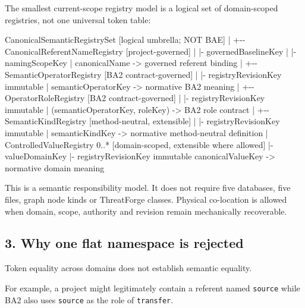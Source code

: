 \documentclass[
  10pt,
  a4paper,
]{article}
\newenvironment{Shaded}{}{}
\newcommand{\NormalTok}[1]{#1}
\begin{document}
The smallest current-scope registry model is a logical set of
domain-scoped registries, not one universal token table:

\begin{Shaded}
\begin{Highlighting}[]
\NormalTok{CanonicalSemanticRegistrySet                    [logical umbrella; NOT BAE]}
\NormalTok{|}
\NormalTok{+{-}{-} CanonicalReferentNameRegistry                [project{-}governed]}
\NormalTok{|    |{-} governedBaselineKey}
\NormalTok{|    |{-} namingScopeKey}
\NormalTok{|    \textasciigrave{}{-} canonicalName {-}\textgreater{} governed referent binding}
\NormalTok{|}
\NormalTok{+{-}{-} SemanticOperatorRegistry                     [BA2 contract{-}governed]}
\NormalTok{|    |{-} registryRevisionKey immutable}
\NormalTok{|    \textasciigrave{}{-} semanticOperatorKey {-}\textgreater{} normative BA2 meaning}
\NormalTok{|}
\NormalTok{+{-}{-} OperatorRoleRegistry                         [BA2 contract{-}governed]}
\NormalTok{|    |{-} registryRevisionKey immutable}
\NormalTok{|    \textasciigrave{}{-} (semanticOperatorKey, roleKey) {-}\textgreater{} BA2 role contract}
\NormalTok{|}
\NormalTok{+{-}{-} SemanticKindRegistry                         [method{-}neutral, extensible]}
\NormalTok{|    |{-} registryRevisionKey immutable}
\NormalTok{|    \textasciigrave{}{-} semanticKindKey {-}\textgreater{} normative method{-}neutral definition}
\NormalTok{|}
\NormalTok{\textasciigrave{}{-}{-} ControlledValueRegistry 0..*                 [domain{-}scoped, extensible where allowed]}
\NormalTok{     |{-} valueDomainKey}
\NormalTok{     |{-} registryRevisionKey immutable}
\NormalTok{     \textasciigrave{}{-} canonicalValueKey {-}\textgreater{} normative domain meaning}
\end{Highlighting}
\end{Shaded}

This is a semantic responsibility model. It does not require five
databases, five files, graph node kinds or ThreatForge classes. Physical
co-location is allowed when domain, scope, authority and revision remain
mechanically recoverable.

\subsection{3. Why one flat namespace is
rejected}\label{why-one-flat-namespace-is-rejected}

Token equality across domains does not establish semantic equality.

For example, a project might legitimately contain a referent named
\texttt{source} while BA2 also uses \texttt{source} as the role of
\texttt{transfer}.
\end{document}
